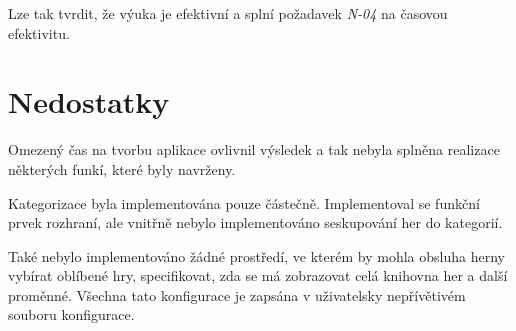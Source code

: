 Lze tak tvrdit, že výuka je efektivní a splní požadavek \emph{N-04} na
časovou efektivitu.

\section{Nedostatky}\label{nedostatky}

Omezený čas na tvorbu aplikace ovlivnil výsledek a tak nebyla splněna realizace
některých funkí, které byly navrženy.

Kategorizace byla implementována pouze částečně. Implementoval se funkční
prvek rozhraní, ale vnitřně nebylo implementováno seskupování her do kategorií.

Také nebylo implementováno žádné prostředí, ve kterém by mohla obsluha herny
vybírat oblíbené hry, specifikovat, zda se má zobrazovat celá knihovna her
a další proměnné. Všechna tato konfigurace je zapsána v 
uživatelsky nepřívětivém souboru konfigurace.
